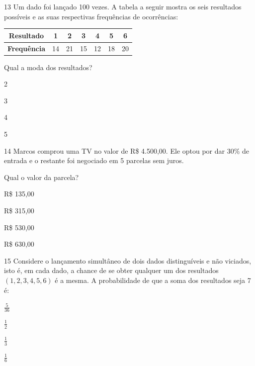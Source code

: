 \num{13} Um dado foi lançado 100 vezes. A tabela a seguir mostra os seis
resultados possíveis e as suas respectivas frequências de ocorrências:

\begin{center}
\begin{tabular}{|c|c|c|c|c|c|c|}
  \hline \textbf{Resultado} & 1 & 2 & 3 & 4 & 5 & 6 \\ \hline
\textbf{Frequência} & 14 & 21 & 15 & 12 & 18 & 20 \\ \hline
\end{tabular}
\end{center}

Qual a moda dos resultados?

\begin{escolha}

  \item 2

  \item 3

  \item 4

  \item 5

\end{escolha}

\pagebreak
\num{14} Marcos comprou uma TV no valor de R\$ 4.500,00. Ele optou por dar
30\% de entrada e o restante foi negociado em 5 parcelas sem juros.

Qual o valor da parcela?

\begin{escolha}
  \item R\$ 135,00

  \item R\$ 315,00

  \item R\$ 530,00

  \item R\$ 630,00
\end{escolha}

\num{15} Considere o lançamento simultâneo de dois dados
distinguíveis e não viciados, isto é, em cada dado, a chance de se obter
qualquer um dos resultados $(1, 2, 3, 4, 5, 6)$ é a mesma. A probabilidade
de que a soma dos resultados seja 7 é:

\begin{escolha}

  \item $\frac{5}{36}$

  \item $\frac{1}{2}$

  \item $\frac{1}{3}$

  \item $\frac{1}{6}$

\end{escolha}

